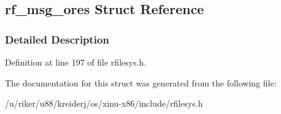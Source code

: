 \hypertarget{structrf__msg__ores}{}\subsection{rf\+\_\+msg\+\_\+ores Struct Reference}
\label{structrf__msg__ores}


\subsubsection{Detailed Description}


Definition at line 197 of file rfilesys.\+h.



The documentation for this struct was generated from the following file\+:\begin{DoxyCompactItemize}
\item 
/u/riker/u88/kreiderj/os/xinu-\/x86/include/rfilesys.\+h\end{DoxyCompactItemize}
